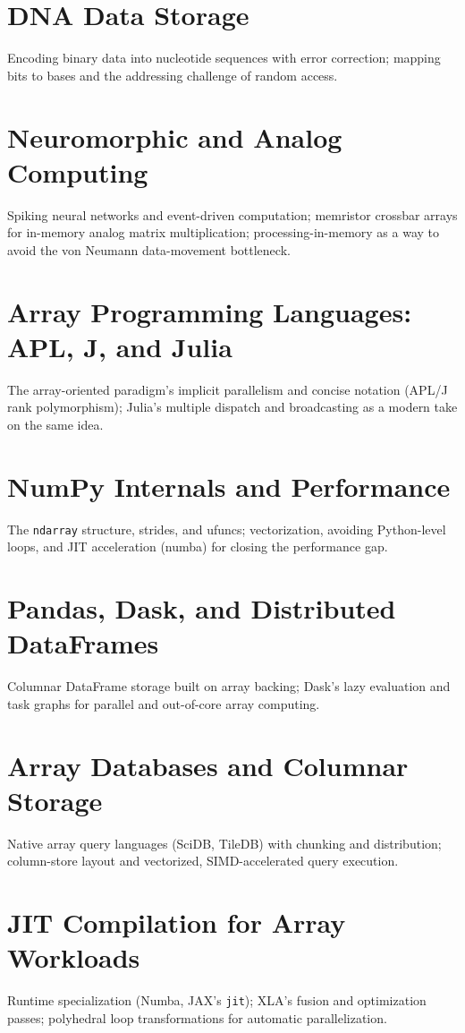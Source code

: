 \chapter{DNA Data Storage}
Encoding binary data into nucleotide sequences with error correction; mapping bits to bases and the addressing challenge of random access.

\chapter{Neuromorphic and Analog Computing}
Spiking neural networks and event-driven computation; memristor crossbar arrays for in-memory analog matrix multiplication; processing-in-memory as a way to avoid the von Neumann data-movement bottleneck.

\chapter{Array Programming Languages: APL, J, and Julia}
The array-oriented paradigm's implicit parallelism and concise notation (APL/J rank polymorphism); Julia's multiple dispatch and broadcasting as a modern take on the same idea.

\chapter{NumPy Internals and Performance}
The \texttt{ndarray} structure, strides, and ufuncs; vectorization, avoiding Python-level loops, and JIT acceleration (numba) for closing the performance gap.

\chapter{Pandas, Dask, and Distributed DataFrames}
Columnar DataFrame storage built on array backing; Dask's lazy evaluation and task graphs for parallel and out-of-core array computing.

\chapter{Array Databases and Columnar Storage}
Native array query languages (SciDB, TileDB) with chunking and distribution; column-store layout and vectorized, SIMD-accelerated query execution.

\chapter{JIT Compilation for Array Workloads}
Runtime specialization (Numba, JAX's \texttt{jit}); XLA's fusion and optimization passes; polyhedral loop transformations for automatic parallelization.

